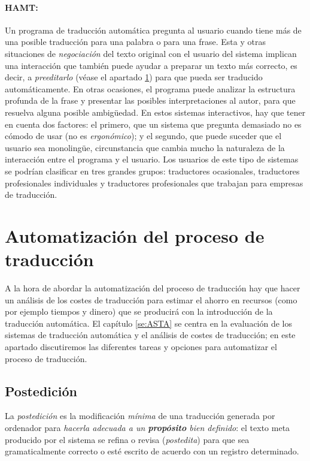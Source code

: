 \paragraph{HAMT:} Un programa de traducción automática pregunta al usuario cuando tiene más de una posible traducción para una palabra o para una frase. Esta y otras situaciones de \emph{negociación} del texto original con el usuario del sistema implican una interacción que también puede ayudar a preparar un texto más correcto, es decir, a \emph{preeditarlo} (véase el apartado \ref{ss:preedposted}) para que pueda ser traducido automáticamente. En otras ocasiones, el programa puede analizar la estructura profunda de la frase y presentar las posibles interpretaciones al autor, para que resuelva alguna posible ambigüedad. En estos sistemas interactivos, hay que tener en cuenta dos factores: el primero, que un sistema que pregunta demasiado no es cómodo de usar (no es \emph{ergonómico}); y el segundo, que puede suceder que el usuario sea monolingüe, circunstancia que cambia mucho la naturaleza de la interacción entre el programa y el usuario. Los usuarios de este tipo de sistemas se podrían clasificar en tres grandes grupos: traductores ocasionales, traductores profesionales individuales y traductores profesionales que trabajan para empresas de traducción. 

\section{Automatización del proceso de traducción} \label{ss:preedposted} A la hora de abordar la automatización del proceso de traducción hay que hacer un análisis de los costes de traducción para estimar el ahorro en recursos (como por ejemplo tiempos y dinero) que se producirá con la introducción de la traducción automática. El capítulo \ref{se:ASTA} se centra en la evaluación de los sistemas de traducción automática y el análisis de costes de traducción; en este apartado discutiremos las diferentes tareas y opciones para automatizar el proceso de traducción. 

\subsection{Postedición} \label{ss:postedicio} La \emph{postedición} es la modificación \emph{mínima} de una traducción generada por ordenador para \emph{hacerla adecuada a un \textbf{propósito} bien definido}: el texto meta producido por el sistema se refina o revisa ({\em postedita}) para que sea gramaticalmente correcto o esté escrito de acuerdo con un registro determinado. 

